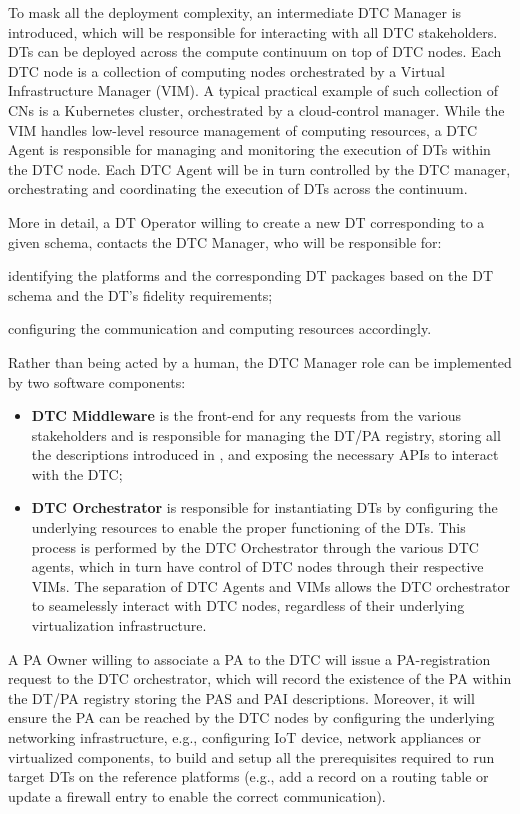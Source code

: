 To mask all the deployment complexity, an intermediate DTC Manager is introduced, which will be responsible for interacting with all DTC stakeholders.
\acp{DT} can be deployed across the compute continuum on top of DTC nodes.
%
Each DTC node is a collection of computing nodes orchestrated by a Virtual Infrastructure Manager (VIM). A typical practical example of such collection of CNs is a Kubernetes cluster, orchestrated by a cloud-control manager.
%
While the VIM handles low-level resource management of computing resources, a DTC Agent is responsible for managing and monitoring the execution of \acp{DT} within the DTC node. Each DTC Agent will be in turn controlled by the DTC manager, orchestrating and coordinating the execution of \acp{DT} across the continuum.

More in detail, a DT Operator willing to create a new DT corresponding to a given schema, contacts the DTC Manager, who will be responsible for:
\begin{inlinelist}
    \item identifying the platforms and the corresponding DT packages based on the DT schema and the DT's fidelity requirements;
    \item configuring the communication and computing resources accordingly.
\end{inlinelist}

Rather than being acted by a human, the DTC Manager role can be implemented by two software components:
\begin{itemize}
    \item \textbf{DTC Middleware} is the front-end for any requests from the various stakeholders and is responsible for managing the DT/\ac{PA} registry, storing all the descriptions introduced in , and exposing the necessary APIs to interact with the DTC;
    \item \textbf{DTC Orchestrator} is responsible for instantiating \acp{DT} by configuring the underlying resources to enable the proper functioning of the \acp{DT}. This process is performed by the DTC Orchestrator through the various DTC agents, which in turn have control of DTC nodes through their respective VIMs. The separation of DTC Agents and VIMs allows the DTC orchestrator to seamelessly interact with DTC nodes, regardless of their underlying virtualization infrastructure.
\end{itemize}

A \ac{PA} Owner willing to associate a \ac{PA} to the DTC will issue a PA-registration request to the DTC orchestrator, which will record the existence of the \ac{PA} within the DT/\ac{PA} registry storing the PAS and PAI descriptions.
%
Moreover, it will ensure the \ac{PA} can be reached by the DTC nodes by configuring the underlying networking infrastructure, e.g., configuring IoT device, network appliances or virtualized components, to build and setup all the prerequisites required to run target \acp{DT} on the reference platforms (e.g., add a record on a routing table or update a firewall entry to enable the correct communication). 


